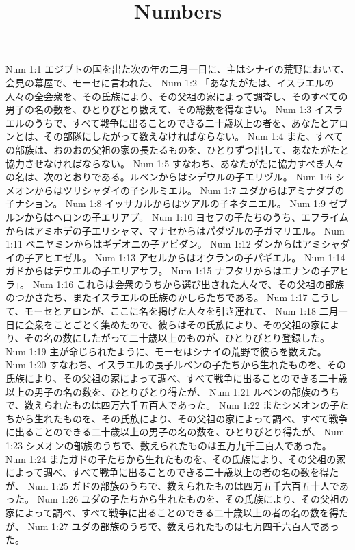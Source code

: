 

\title{Numbers}

Num 1:1  エジプトの国を出た次の年の二月一日に、主はシナイの荒野において、会見の幕屋で、モーセに言われた、
Num 1:2  「あなたがたは、イスラエルの人々の全会衆を、その氏族により、その父祖の家によって調査し、そのすべての男子の名の数を、ひとりびとり数えて、その総数を得なさい。
Num 1:3  イスラエルのうちで、すべて戦争に出ることのできる二十歳以上の者を、あなたとアロンとは、その部隊にしたがって数えなければならない。
Num 1:4  また、すべての部族は、おのおの父祖の家の長たるものを、ひとりずつ出して、あなたがたと協力させなければならない。
Num 1:5  すなわち、あなたがたに協力すべき人々の名は、次のとおりである。ルベンからはシデウルの子エリヅル。
Num 1:6  シメオンからはツリシャダイの子シルミエル。
Num 1:7  ユダからはアミナダブの子ナション。
Num 1:8  イッサカルからはツアルの子ネタニエル。
Num 1:9  ゼブルンからはヘロンの子エリアブ。
Num 1:10  ヨセフの子たちのうち、エフライムからはアミホデの子エリシャマ、マナセからはパダヅルの子ガマリエル。
Num 1:11  ベニヤミンからはギデオニの子アビダン。
Num 1:12  ダンからはアミシャダイの子アヒエゼル。
Num 1:13  アセルからはオクランの子パギエル。
Num 1:14  ガドからはデウエルの子エリアサフ。
Num 1:15  ナフタリからはエナンの子アヒラ」。
Num 1:16  これらは会衆のうちから選び出された人々で、その父祖の部族のつかさたち、またイスラエルの氏族のかしらたちである。
Num 1:17  こうして、モーセとアロンが、ここに名を掲げた人々を引き連れて、
Num 1:18  二月一日に会衆をことごとく集めたので、彼らはその氏族により、その父祖の家により、その名の数にしたがって二十歳以上のものが、ひとりびとり登録した。
Num 1:19  主が命じられたように、モーセはシナイの荒野で彼らを数えた。
Num 1:20  すなわち、イスラエルの長子ルベンの子たちから生れたものを、その氏族により、その父祖の家によって調べ、すべて戦争に出ることのできる二十歳以上の男子の名の数を、ひとりびとり得たが、
Num 1:21  ルベンの部族のうちで、数えられたものは四万六千五百人であった。
Num 1:22  またシメオンの子たちから生れたものを、その氏族により、その父祖の家によって調べ、すべて戦争に出ることのできる二十歳以上の男子の名の数を、ひとりびとり得たが、
Num 1:23  シメオンの部族のうちで、数えられたものは五万九千三百人であった。
Num 1:24  またガドの子たちから生れたものを、その氏族により、その父祖の家によって調べ、すべて戦争に出ることのできる二十歳以上の者の名の数を得たが、
Num 1:25  ガドの部族のうちで、数えられたものは四万五千六百五十人であった。
Num 1:26  ユダの子たちから生れたものを、その氏族により、その父祖の家によって調べ、すべて戦争に出ることのできる二十歳以上の者の名の数を得たが、
Num 1:27  ユダの部族のうちで、数えられたものは七万四千六百人であった。

